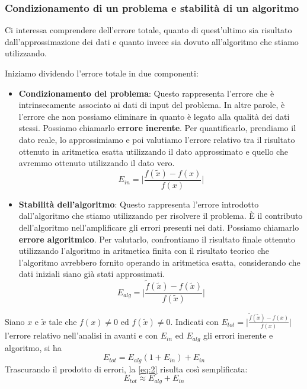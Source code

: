 \documentclass{article}
\begin{document}
\subsubsection{Condizionamento di un problema e stabilità di un algoritmo}

Ci interessa comprendere dell'errore totale, quanto di
quest'ultimo sia risultato dall'approssimazione dei dati e quanto invece sia
dovuto all'algoritmo che stiamo utilizzando.

Iniziamo dividendo l'errore totale in due componenti:
\begin{itemize}
    \item \textbf{Condizionamento del problema}: Questo rappresenta l'errore
        che è intrinsecamente associato ai dati di input del problema. In altre
        parole, è l'errore che non possiamo eliminare in quanto è legato alla
        qualità dei dati stessi. Possiamo chiamarlo \textbf{errore inerente}.
        Per quantificarlo, prendiamo il dato reale, lo approssimiamo e poi
        valutiamo l'errore relativo tra il risultato ottenuto in aritmetica esatta  
        utilizzando il  dato approssimato e quello che avremmo ottenuto utilizzando il dato
        vero.
        $$E_{in}=\Big\lvert \frac{f(\tilde{x})-f(x)}{f(x)}\Big\rvert$$
    \item \textbf{Stabilità dell'algoritmo}: Questo rappresenta l'errore
        introdotto dall'algoritmo che stiamo utilizzando per risolvere il
        problema. È il contributo dell'algoritmo nell'amplificare gli errori
        presenti nei dati. Possiamo chiamarlo \textbf{errore algoritmico}. Per
        valutarlo, confrontiamo il risultato finale ottenuto utilizzando
        l'algoritmo in aritmetica finita con il risultato teorico che
        l'algoritmo avrebbero fornito operando in aritmetica esatta,
        considerando che dati iniziali siano già stati approssimati.
        $$E_{alg}=\Big\lvert
        \frac{\tilde{f}(\tilde{x})-f(\tilde{x})}{f(\tilde{x})} \Big\rvert$$
\end{itemize}
\begin{theorem}
    Siano $x$ e $\tilde{x}$ tale che $f(x)\neq0$ ed $f(\tilde{x})\neq0$.
    Indicati con $E_{tot}=\Big\lvert
    \frac{\tilde{f}(\tilde{x})-f(x)}{f(x)}\Big\rvert$ l'errore relativo 
    nell'analisi in avanti e con
    $E_{in}$ ed $E_{alg}$ gli errori inerente e algoritmo, si ha 
    \begin{equation} \label{eq:2}
        E_{tot}=E_{alg}(1+E_{in})+E_{in}
    \end{equation}
    Trascurando il prodotto di errori, la \ref{eq:2} risulta così semplificata:
    {\color{green}$$E_{tot}\approx E_{alg}+E_{in}$$}
\end{theorem}
\end{document}
